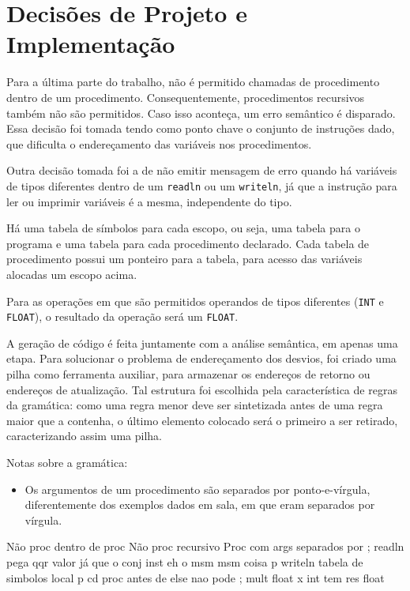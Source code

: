 \section{Decisões de Projeto e Implementação}
\label{sec:decisoes}

Para a última parte do trabalho, não é permitido chamadas de
procedimento dentro de um procedimento. Consequentemente, procedimentos
recursivos também não são permitidos. Caso isso aconteça, um erro semântico é
disparado. Essa decisão foi tomada tendo como ponto chave o conjunto de
instruções dado, que dificulta o endereçamento das variáveis nos procedimentos.

Outra decisão tomada foi a de não emitir mensagem de erro quando há variáveis
de tipos diferentes dentro de um \texttt{readln} ou um \texttt{writeln}, já que
a instrução para ler ou imprimir variáveis é a mesma, independente do tipo.

Há uma tabela de símbolos para cada escopo, ou seja, uma tabela para o programa
e uma tabela para cada procedimento declarado. Cada tabela de procedimento
possui um ponteiro para a tabela, para acesso das variáveis alocadas um escopo
acima.

Para as operações em que são permitidos operandos de tipos diferentes 
(\texttt{INT} e \texttt{FLOAT}), o resultado da operação será um \texttt{FLOAT}.

A geração de código é feita juntamente com a análise semântica, em apenas uma
etapa. Para solucionar o problema de endereçamento dos desvios, foi criado uma
pilha como ferramenta auxiliar, para armazenar os endereços de retorno ou
endereços de atualização. Tal estrutura foi escolhida pela característica de
regras da gramática: como uma regra menor deve ser sintetizada antes de uma
regra maior que a contenha, o último elemento colocado será o primeiro a ser
retirado, caracterizando assim uma pilha.

Notas sobre a gramática:
\begin{itemize}
	\item Os argumentos de um procedimento são separados por ponto-e-vírgula,
	diferentemente dos exemplos dados em sala, em que eram separados por
	vírgula.
\end{itemize}

Não proc dentro de proc
Não proc recursivo
Proc com args separados por ;
readln pega qqr valor já que o conj inst eh o msm
msm coisa p writeln
tabela de simbolos local p cd proc
antes de else nao pode ;
mult float x int tem res float

